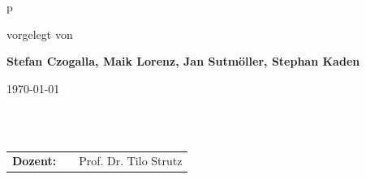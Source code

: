 \begin{center}
\begin{tabular}{p{\textwidth}}
\begin{center}
vorgelegt von
\end{center}

\begin{center}
\large{\textbf{Stefan Czogalla, Maik Lorenz, Jan Sutmöller, Stephan Kaden}} \\
\small{}
\end{center}

\begin{center}
\large{\today}
\end{center}

\\

\\

\begin{center}
\begin{tabular}{lll}
\textbf{Dozent:} & & Prof. Dr. Tilo Strutz\\
\end{tabular}


\end{center}

\end{tabular}
\end{center}
